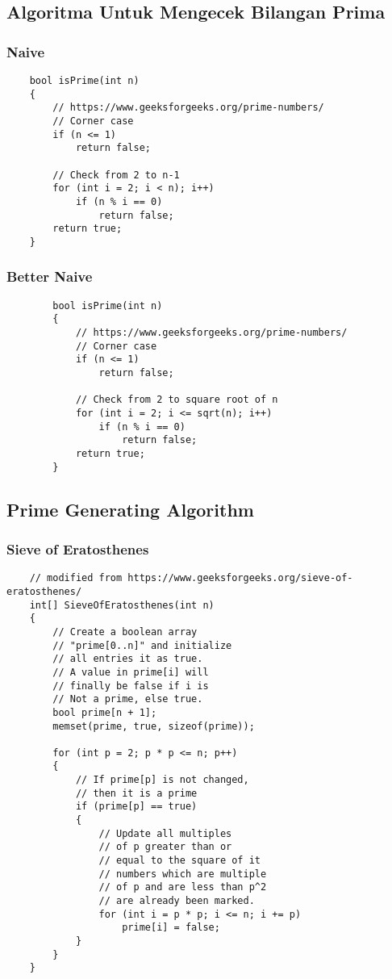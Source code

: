 	\subsection{Algoritma Untuk Mengecek Bilangan Prima}
	\subsubsection{Naive}
	\begin{lstlisting}
	bool isPrime(int n)
	{
		// https://www.geeksforgeeks.org/prime-numbers/
	    // Corner case
	    if (n <= 1)
	        return false;
	 
	    // Check from 2 to n-1
	    for (int i = 2; i < n); i++)
	        if (n % i == 0)
	            return false;
	    return true;
	}
	\end{lstlisting}
	
	\subsubsection{Better Naive}
	\begin{lstlisting}
		bool isPrime(int n)
		{
			// https://www.geeksforgeeks.org/prime-numbers/
		    // Corner case
		    if (n <= 1)
		        return false;
		 
		    // Check from 2 to square root of n
		    for (int i = 2; i <= sqrt(n); i++)
		        if (n % i == 0)
		            return false;
		    return true;
		}
		\end{lstlisting}
	
	\subsection{Prime Generating Algorithm}
	\subsubsection{Sieve of Eratosthenes}
	\begin{lstlisting}
	// modified from https://www.geeksforgeeks.org/sieve-of-eratosthenes/
	int[] SieveOfEratosthenes(int n)
	{
	    // Create a boolean array
	    // "prime[0..n]" and initialize
	    // all entries it as true.
	    // A value in prime[i] will
	    // finally be false if i is
	    // Not a prime, else true.
	    bool prime[n + 1];
	    memset(prime, true, sizeof(prime));
	 
	    for (int p = 2; p * p <= n; p++)
	    {
	        // If prime[p] is not changed,
	        // then it is a prime
	        if (prime[p] == true)
	        {
	            // Update all multiples
	            // of p greater than or
	            // equal to the square of it
	            // numbers which are multiple
	            // of p and are less than p^2
	            // are already been marked.
	            for (int i = p * p; i <= n; i += p)
	                prime[i] = false;
	        }
	    }
	}
	\end{lstlisting}
	
